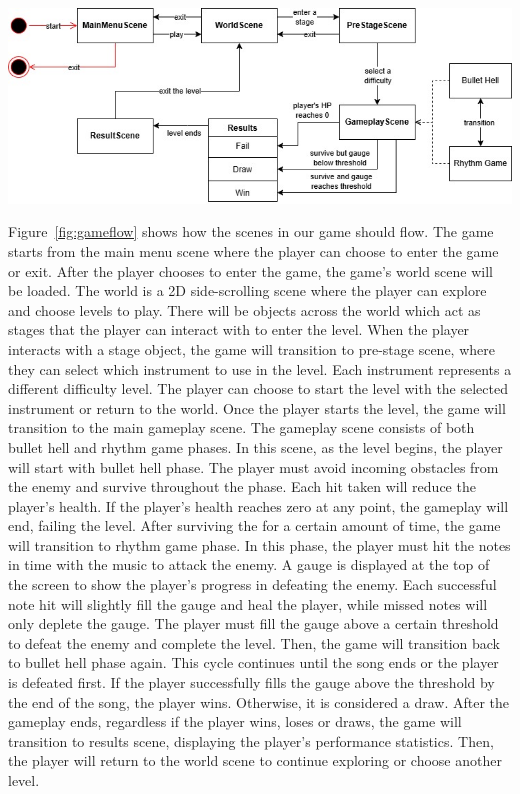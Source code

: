 \vspace{0.5cm}

\noindent
\begin{minipage}{\columnwidth}
    \centering
    \includegraphics[width=\columnwidth, keepaspectratio]{images/gameflow}
    \label{fig:gameflow}
\end{minipage}

\vspace{0.5cm}

\noindent Figure~\ref{fig:gameflow} shows how the scenes in our game should flow.
The game starts from the main menu scene where the player can choose to enter the game or exit.
After the player chooses to enter the game, the game's world scene will be loaded.
The world is a 2D side-scrolling scene where the player can explore and choose levels to play.
There will be objects across the world which act as stages that the player can interact with to 
enter the level.
When the player interacts with a stage object, the game will transition to pre-stage scene, where 
they can select which instrument to use in the level.
Each instrument represents a different difficulty level.
The player can choose to start the level with the selected instrument or return to the world.
Once the player starts the level, the game will transition to the main gameplay scene.
The gameplay scene consists of both bullet hell and rhythm game phases.
In this scene, as the level begins, the player will start with bullet hell phase.
The player must avoid incoming obstacles from the enemy and survive throughout the phase.
Each hit taken will reduce the player's health.
If the player's health reaches zero at any point, the gameplay will end, failing the level.
After surviving the for a certain amount of time, the game will transition to rhythm game phase.
In this phase, the player must hit the notes in time with the music to attack the enemy.
A gauge is displayed at the top of the screen to show the player's progress in defeating the enemy.
Each successful note hit will slightly fill the gauge and heal the player, while missed notes will 
only deplete the gauge.
The player must fill the gauge above a certain threshold to defeat the enemy and complete the level.
Then, the game will transition back to bullet hell phase again.
This cycle continues until the song ends or the player is defeated first.
If the player successfully fills the gauge above the threshold by the end of the song, the player wins.
Otherwise, it is considered a draw.
After the gameplay ends, regardless if the player wins, loses or draws, the game will transition to results 
scene, displaying the player's performance statistics.
Then, the player will return to the world scene to continue exploring or choose another level.